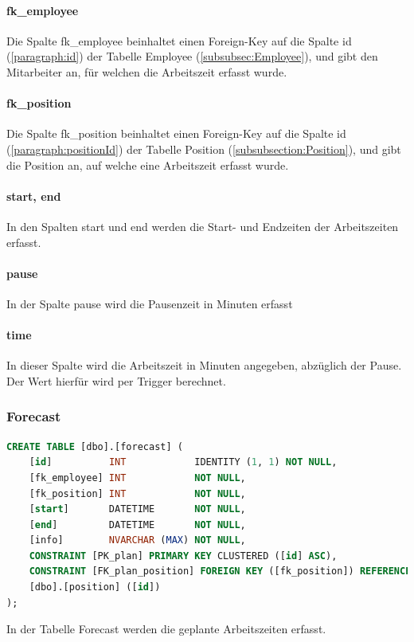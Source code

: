 \documentclass{article}
\begin{document}
\paragraph{fk\_employee} Die Spalte fk\_employee beinhaltet einen Foreign-Key auf die Spalte id
(\ref{paragraph:id}) der Tabelle Employee (\ref{subsubsec:Employee}), und gibt
den Mitarbeiter an, für welchen die Arbeitszeit erfasst wurde.

\paragraph{fk\_position} Die Spalte fk\_position beinhaltet einen Foreign-Key auf die Spalte id
(\ref{paragraph:positionId}) der Tabelle Position
(\ref{subsubsection:Position}), und gibt die Position an, auf welche eine
Arbeitszeit erfasst wurde.

\paragraph{start, end} In den Spalten start und end werden die Start- und Endzeiten der Arbeitszeiten
erfasst.

\paragraph{pause} In der Spalte pause wird die Pausenzeit in Minuten erfasst

\paragraph{time} In dieser Spalte wird die Arbeitszeit in Minuten angegeben, abzüglich der
Pause. Der Wert hierfür wird per Trigger berechnet.

\subsubsection{Forecast}
\begin{lstlisting}[language=Sql, caption= Create Table Statement für Forecast Table]
    CREATE TABLE [dbo].[forecast] (
    [id]          INT            IDENTITY (1, 1) NOT NULL,
    [fk_employee] INT            NOT NULL,
    [fk_position] INT            NOT NULL,
    [start]       DATETIME       NOT NULL,
    [end]         DATETIME       NOT NULL,
    [info]        NVARCHAR (MAX) NOT NULL,
    CONSTRAINT [PK_plan] PRIMARY KEY CLUSTERED ([id] ASC),
    CONSTRAINT [FK_plan_position] FOREIGN KEY ([fk_position]) REFERENCES 
    [dbo].[position] ([id])
);


         \end{lstlisting}
In der Tabelle Forecast werden die geplante Arbeitszeiten erfasst.
\end{document}
